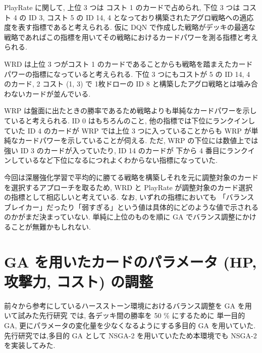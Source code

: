 \documentclass{jarticle}     %
\begin{document}
PlayRate に関して, 上位 3 つは コスト 1 のカードで占められ, 下位 3 つは コスト 4 の ID 3, コスト 5 の ID 14, 4 となっており構築されたアグロ戦略への適応度を表す指標であると考えられる. 仮に DQN で作成した戦略がデッキの最適な戦略であればこの指標を用いてその戦略におけるカードパワーを測る指標と考えられる.\par
WRD は上位 3 つがコスト 1 のカードであることからも戦略を踏まえたカードパワーの指標になっていると考えられる. 下位 3 つにもコストが 5 の ID 14, 4 のカード, 2 コスト (1, 3) で 1枚ドローの ID 8 と構築したアグロ戦略とは噛み合わないカードが並んでいる.\par
WRP は盤面に出たときの勝率であるため戦略よりも単純なカードパワーを示していると考えられる. ID 0 はもちろんのこと, 他の指標では下位にランクインしていた ID 4 のカードが WRP では上位 3 つに入っていることからも WRP が単純なカードパワーを示していることが伺える. 
ただ, WRP の下位には数値上では強い ID 3 のカードが入っていたり, ID 14 のカードが 下から 4 番目にランクインしているなど下位になるにつれよくわからない指標になっていた.\par
今回は深層強化学習で平均的に勝てる戦略を構築しそれを元に調整対象のカードを選択するアプローチを取るため, WRD と PlayRate が調整対象のカード選択の指標として相応しいと考えている. なお, いずれの指標においても 「バランスブレイカー」だったり「弱すぎる」という値は具体的にどのような値で示されるのかがまだ決まっていない. 単純に上位のものを順に GA でバランス調整にかけることが無難かもしれない. 
  
 \section{GA を用いたカードのパラメータ (HP, 攻撃力, コスト) の調整}
前々から参考にしているハースストーン環境におけるバランス調整を GA を用いて試みた先行研究 \cite{Hearthstone} では, 各デッキ間の勝率を 50 \% にするために 単一目的 GA, 更にパラメータの変化量を少なくなるようにする多目的 GA を用いていた. 先行研究では,多目的 GA として NSGA-2 を用いていたため本環境でも NSGA-2 を実装してみた\cite{NSGA}.
\end{document}
